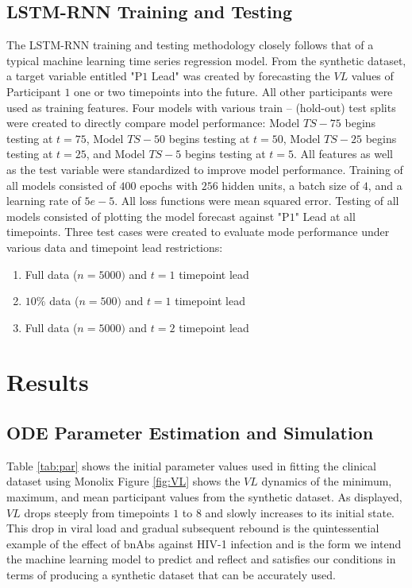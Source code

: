 \documentclass[fleqn,10pt]{wlscirep}
\begin{document}
\subsection*{LSTM-RNN Training and Testing}
The LSTM-RNN training and testing methodology closely follows that of a typical machine learning time series regression model. From the synthetic dataset, a target variable entitled "P$1$ Lead" was created by forecasting the $VL$ values of Participant $1$ one or two timepoints into the future. All other participants were used as training features. Four models with various train -- (hold-out) test splits were created to directly compare model performance: Model $TS-75$ begins testing at $t=75$, Model $TS-50$ begins testing at $t=50$, Model $TS-25$ begins testing at $t=25$, and Model $TS-5$ begins testing at $t=5$. All features as well as the test variable were standardized to improve model performance. Training of all models consisted of $400$ epochs with $256$ hidden units, a batch size of $4$, and a learning rate of $5e-5$. All loss functions were mean squared error. Testing of all models consisted of plotting the model forecast against "P$1$" Lead at all timepoints. Three test cases were created to evaluate mode performance under various data and timepoint lead restrictions:
\begin{enumerate}
    \item Full data ($n=5000)$ and $t=1$ timepoint lead
    \item $10\%$ data ($n=500)$ and $t=1$ timepoint lead
    \item Full data ($n=5000)$ and $t=2$ timepoint lead
\end{enumerate}



\section*{Results}

\subsection*{ODE Parameter Estimation and Simulation}

Table \ref{tab:par} shows the initial parameter values used in fitting the clinical dataset using Monolix Figure \ref{fig:VL} shows the $VL$ dynamics of the minimum, maximum, and mean participant values from the synthetic dataset. As displayed, $VL$ drops steeply from timepoints $1$ to $8$ and slowly increases to its initial state. This drop in viral load and gradual subsequent rebound is the quintessential example of the effect of bnAbs against HIV-1 infection and is the form we intend the machine learning model to predict and reflect and satisfies our conditions in terms of producing a synthetic dataset that can be accurately used.
\end{document}
